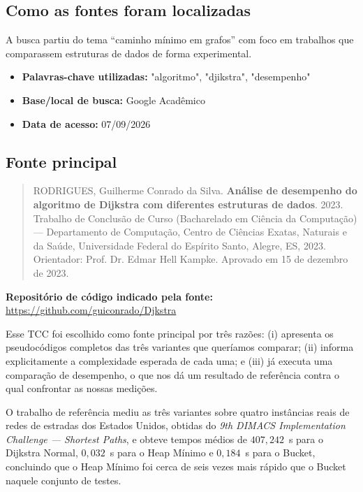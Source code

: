 \documentclass[12pt,a4paper]{article}
\begin{document}
\subsection{Como as fontes foram localizadas}

A busca partiu do tema ``caminho mínimo em grafos'' com foco em trabalhos que
comparassem estruturas de dados de forma experimental.

\begin{itemize}
  \item \textbf{Palavras-chave utilizadas:} "algoritmo", "djikstra", "desempenho"
  \item \textbf{Base/local de busca:} Google Acadêmico
  \item \textbf{Data de acesso:} 07/09/2026
\end{itemize}

\subsection{Fonte principal}

\begin{quote}
RODRIGUES, Guilherme Conrado da Silva. \textbf{Análise de desempenho do
algoritmo de Dijkstra com diferentes estruturas de dados}. 2023. Trabalho de
Conclusão de Curso (Bacharelado em Ciência da Computação) --- Departamento de
Computação, Centro de Ciências Exatas, Naturais e da Saúde, Universidade
Federal do Espírito Santo, Alegre, ES, 2023. Orientador: Prof. Dr. Edmar Hell
Kampke. Aprovado em 15 de dezembro de 2023.
\end{quote}

\noindent
\textbf{Repositório de código indicado pela fonte:}
\url{https://github.com/guiconrado/Djkstra}

Esse TCC foi escolhido como fonte principal por três razões: (i) apresenta os
pseudocódigos completos das três variantes que queríamos comparar; (ii) informa
explicitamente a complexidade esperada de cada uma; e (iii) já executa uma
comparação de desempenho, o que nos dá um resultado de referência contra o
qual confrontar as nossas medições.

O trabalho de referência mediu as três variantes sobre quatro instâncias reais
de redes de estradas dos Estados Unidos, obtidas do \emph{9th DIMACS
Implementation Challenge --- Shortest Paths}, e obteve tempos médios de
$407{,}242$~s para o Dijkstra Normal, $0{,}032$~s para o Heap Mínimo e
$0{,}184$~s para o Bucket, concluindo que o Heap Mínimo foi cerca de seis vezes
mais rápido que o Bucket naquele conjunto de testes.
\end{document}
